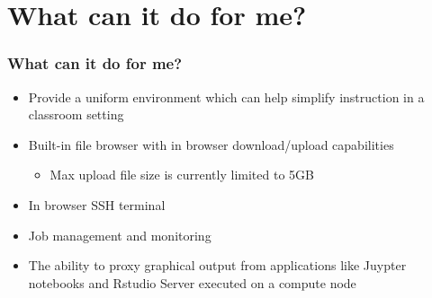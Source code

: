 \section[Why]{What can it do for me?}
\begin{frame}
	\frametitle{What can it do for me?}
	\begin{itemize}
	\item Provide a uniform environment which can help simplify instruction in a classroom setting
	\item Built-in file browser with in browser download/upload capabilities
		\begin{itemize}
		\item Max upload file size is currently limited to 5GB
		\end{itemize}
	\item In browser SSH terminal
	\item Job management and monitoring
	\item The ability to proxy graphical output from applications like Juypter notebooks and Rstudio Server executed on a compute node
	\end{itemize}
\end{frame}

